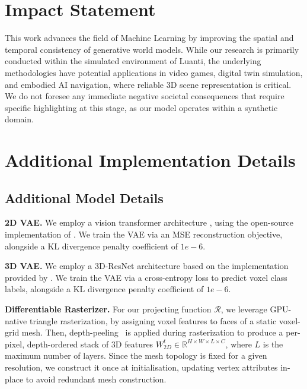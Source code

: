 \documentclass{article}
\theoremstyle{plain}
\theoremstyle{definition}
\theoremstyle{remark}
\begin{document}
\section*{Impact Statement}

This work advances the field of Machine Learning by improving the spatial and temporal consistency of generative world models.
While our research is primarily conducted within the simulated environment of Luanti, the underlying methodologies have potential applications in video games, digital twin simulation, and embodied AI navigation, where reliable 3D scene representation is critical.
We do not foresee any immediate negative societal consequences that require specific highlighting at this stage, as our model operates within a synthetic domain.


  


\newpage
\appendix
{}
\onecolumn

\section{Additional Implementation Details}\label{app:implt}


\subsection{Additional Model Details}

\textbf{2D VAE.} We employ a vision transformer architecture \cite{dosovitskiy2020image}, using the open-source implementation of \cite{decart2024oasis}. We train the VAE via an MSE reconstruction objective, alongside a KL divergence penalty coefficient of $1e-6$.

\textbf{3D VAE.} We employ a 3D-ResNet architecture based on the implementation provided by \cite{xiang2024structured}. We train the VAE via a cross-entropy loss to predict voxel class labels, alongside a KL divergence penalty coefficient of $1e-6$.

\textbf{Differentiable Rasterizer.} For our projecting function $\mathcal{R}$, we leverage GPU-native triangle rasterization, by assigning voxel features to faces of a static voxel-grid mesh. Then, depth-peeling~\cite{bavoil2008order, nagy2003depth} is applied during rasterization to produce a per-pixel, depth-ordered stack of 3D features $W_{2D}^{t} \in \mathbb{R}^{H \times W \times L \times C}$, where $L$ is the maximum number of layers. Since the mesh topology is fixed for a given resolution, we construct it once at initialisation, updating vertex attributes in-place to avoid redundant mesh construction.  
\end{document}

